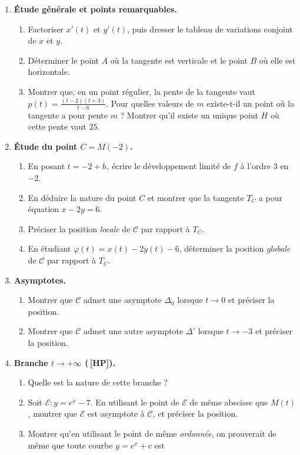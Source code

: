 \documentclass[a4paper,11pt]{article}
\numberwithin{equation}{section}
\numberwithin{figure}{section}
\numberwithin{table}{section}
\theoremstyle{enonce}
\theoremstyle{exemple}
\theoremstyle{remarque}
\newcommand{\HP}{\,{\sffamily\bfseries\scriptsize\textcolor{Brique}{[HP]}}}
\begin{document}
\begin{enumerate}
\item \textbf{Étude générale et points remarquables.}
\begin{enumerate}
\item Factoriser $x'(t)$ et $y'(t)$, puis dresser le tableau de variations conjoint de $x$ et $y$.
\item Déterminer le point $A$ où la tangente est verticale et le point $B$ où elle est horizontale.
\item Montrer que, en un point régulier, la pente de la tangente vaut $p(t)=\frac{(t-2)(t+3)}{t-6}$. Pour quelles valeurs
      de $m$ existe-t-il un point où la tangente a pour pente $m$ ? Montrer qu'il existe un unique point $H$ où cette pente
      vaut $25$.
\end{enumerate}
\item \textbf{Étude du point $C=M(-2)$.}
\begin{enumerate}
\item En posant $t=-2+h$, écrire le développement limité de $f$ à l'ordre $3$ en $-2$.
\item En déduire la nature du point $C$ et montrer que la tangente $T_C$ a pour équation $x-2y=6$.
\item Préciser la position \emph{locale} de $\mathcal C$ par rapport à $T_C$.
\item En étudiant $\varphi(t)=x(t)-2y(t)-6$, déterminer la position \emph{globale} de $\mathcal C$ par rapport à $T_C$.
\end{enumerate}
\item \textbf{Asymptotes.}
\begin{enumerate}
\item Montrer que $\mathcal C$ admet une asymptote $\Delta_0$ lorsque $t\to0$ et préciser la position.
\item Montrer que $\mathcal C$ admet une autre asymptote $\Delta'$ lorsque $t\to-3$ et préciser la position.
\end{enumerate}
\item \textbf{Branche $t\to+\infty$ (\HP).}
\begin{enumerate}
\item Quelle est la nature de cette branche ?
\item Soit $\mathcal E:y=e^x-7$. En utilisant le point de $\mathcal E$ de même abscisse que $M(t)$, montrer que $\mathcal E$
      est asymptote à $\mathcal C$, et préciser la position.
\item Montrer qu'en utilisant le point de même \emph{ordonnée}, on prouverait de même que toute courbe $y=e^x+c$ est

\end{enumerate}
\end{enumerate}
\end{document}
